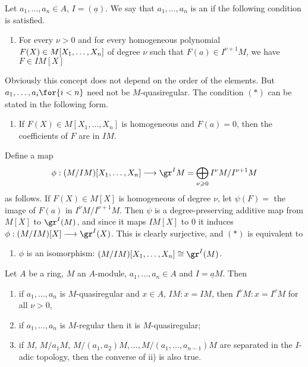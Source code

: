 \documentclass[../main]{subfiles}
\begin{document}
Let $a_1, \ldots, a_n \in A$, $I=(\underline{a})$. We say that $a_1, \ldots, a_n$ is an  if the following condition is satisfied.
\begin{enumerate}[label = (15.$\ast$), ref= cond:15.*]
    \item For every $\nu>0$ and for every homogeneous polynomial $F(X) \in M[X_1, \linebreak\ldots,X_n]$ of degree $\nu$ such that $F(a) \in I^{\nu+1} M$, we have $F \in IM[X]$
\end{enumerate}
Obviously this concept does not depend on the order of the elements. But $a_1, \ldots, a_i\for{i<n}$ need not be $M$-quasiregular. The condition $(*)$ can be stated in the following form.
\begin{enumerate}[label = (15.$\ast\ast$), ref= cond:15.**]
    \item If $F(X) \in M[X_1, \ldots, X_n]$ is homogeneous and $F(a)=0$, then the coefficients of $F$ are in $IM$.
\end{enumerate}
Define a map \[\phi:(M / I M)[X_1, \ldots, X_n] \longrightarrow \gr^IM=\bigoplus_{\nu \geqslant 0} I^\nu M/I^{\nu+1} M\] as follows. If $F(X) \in M[X]$ is homogeneous of degree $\nu$, let $\psi(F)=$ the image of $F(a)$ in $I^\nu M / I^{\nu+1} M$. Then $\psi$ is a degree-preserving additive map from $M[X]$ to $\gr^I(M)$, and since it maps $IM[X]$ to $0$ it induces $\phi:(M/IM)[X]\longrightarrow\gr^I(X)$. This is clearly surjective, and $(*)$ is equivalent to
\begin{enumerate}[label = (15.$\ast\ast\ast$), ref= cond:15.***]
    \item $\phi$ is an isomorphism: $(M/IM)[X_1,\ldots,X_n]\cong\gr^I(M)$.
\end{enumerate}

\begin{theorem}\label{thm:027}
Let $A$ be a ring, $M$ an $A$-module, $a_1,\ldots,a_n\in A$ and $I=\underline{a}M$. Then
\begin{enumerate}
    \item if $a_1,\ldots,a_n$ is $M$-quasiregular and $x\in A$, $IM:x=IM$, then \newline $I^\nu M:x=I^\nu M$ for all $\nu>0$,
    \item if $a_1,\ldots,a_n$ is $M$-regular then it is $M$-quasiregular;
    \item if $M$, $M/a_1M$, $M/(a_1,a_2)M, \ldots, M/(a_1,\ldots,a_{n-1})M$ are separated in the $I$-adic topology, then the converse of ii) is also true.
\end{enumerate}
\end{theorem}
\end{document}
